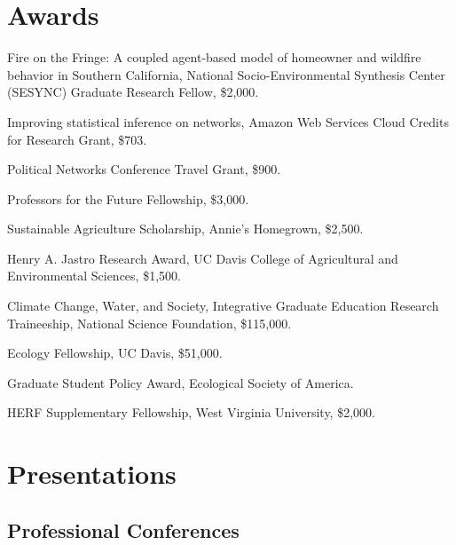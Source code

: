 \section{Awards}\label{awards}

\begin{description}
\tightlist
\item[2016]
Fire on the Fringe: A coupled agent-based model of homeowner and
wildfire behavior in Southern California, National Socio-Environmental
Synthesis Center (SESYNC) Graduate Research Fellow, \$2,000.
\item[2016]
Improving statistical inference on networks, Amazon Web Services Cloud
Credits for Research Grant, \$703.
\item[2016]
Political Networks Conference Travel Grant, \$900.
\item[2015]
Professors for the Future Fellowship, \$3,000.
\item[2014]
Sustainable Agriculture Scholarship, Annie's Homegrown, \$2,500.
\item[2014]
Henry A. Jastro Research Award, UC Davis College of Agricultural and
Environmental Sciences, \$1,500.
\item[2012]
Climate Change, Water, and Society, Integrative Graduate Education
Research Traineeship, National Science Foundation, \$115,000.
\item[2012]
Ecology Fellowship, UC Davis, \$51,000.
\item[2011]
Graduate Student Policy Award, Ecological Society of America.
\item[2009]
HERF Supplementary Fellowship, West Virginia University, \$2,000.
\end{description}

\section{Presentations}\label{presentations}

\subsection{Professional Conferences}\label{professional-conferences}

